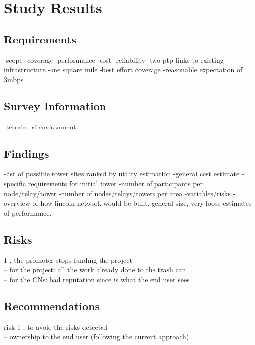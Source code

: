 \section{Study Results}\label{LPA}


%
\subsection{Requirements}
-scope -coverage -performance -cost -reliability
-two ptp links to existing infrastructure
-one square mile
-best effort coverage
-reasonable expectation of 3mbps


\subsection{Survey Information}
-terrain
-rf environment


\subsection{Findings}
-list of possible tower sites ranked by utility estimation
-general cost estimate
-specific requirements for initial tower
-number of participants per node/relay/tower
-number of nodes/relays/towers per area
-variables/risks
-overview of how lincoln network would be built, general size, very loose
estimates of performance. 

\subsection{Risks}
1-. the promoter stops funding the project\\
-- for the project: all the work already done to the trash can\\
-- for the CNs: bad reputation since is what the end user sees\\


\subsection{Recommendations}

risk 1-. to avoid the risks detected\\
-- ownership to the end user (following the current approach)\\

